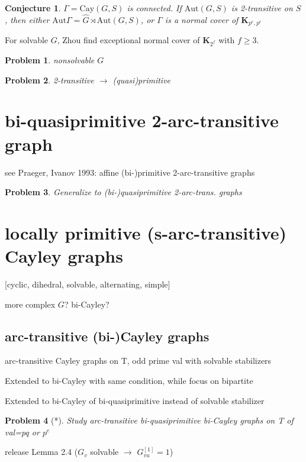 \documentclass[a4paper,11pt,openany]{book}
\newtheorem{conjecture}{Conjecture}[section]
\newtheorem{problem}{Problem}[section]
\def\Aut{\mathrm{Aut}}
\def\Cay{\mathrm{Cay}}
\begin{document}
\begin{conjecture}
	$\Gamma=\Cay(G,S)$ is connected. If $\Aut(G,S)$ is 2-transitive on $S$, then either $\Aut\Gamma=\hat{G}\rtimes \Aut(G,S)$, or $\Gamma$ is a normal cover of $\mathbf{K}_{p^e,p^e}$
\end{conjecture}

For solvable $G$, Zhou find exceptional normal cover of $\mathbf{K}_{2^f}$ with $f\geq 3$.

\begin{problem}
	nonsolvable $G$
\end{problem}

\begin{problem}
	2-transitive $\rightarrow$ (quasi)primitive
\end{problem}



\section{bi-quasiprimitive 2-arc-transitive graph}
see Praeger, Ivanov 1993: affine (bi-)primitive 2-arc-transitive graphs
\begin{problem}
	Generalize to (bi-)quasiprimitive 2-arc-trans. graphs
\end{problem}


\section{locally primitive (s-arc-transitive) Cayley graphs}
[cyclic, dihedral, solvable, alternating, simple] 

more complex $G$? bi-Cayley?

\subsection{arc-transitive (bi-)Cayley graphs}
arc-transitive Cayley graphs on T, odd prime val with solvable stabilizers

Extended to bi-Cayley with same condition, while focus on bipartite

Extended to bi-Cayley of bi-quasiprimitive instead of solvable stabilizer


\begin{problem}[*]
	Study arc-transitive bi-quasiprimitive bi-Cayley graphs on T of val=pq or $p^e$
\end{problem}

release Lemma 2.4 ($G_v$ solvable $\rightarrow$ $G_{vu}^{[1]}=1$)
\end{document}
